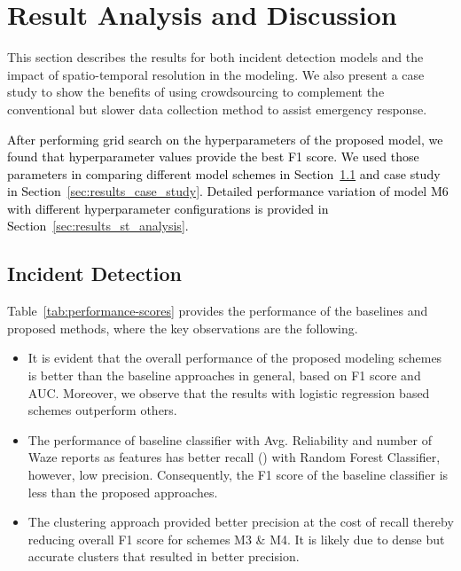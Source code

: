 \documentclass[conference]{IEEEtran}
\begin{document}
\section{Result Analysis and Discussion}
\label{sec:results}



This section describes the results for both incident detection models and the impact of spatio-temporal resolution in the modeling. We also present a case study to show the benefits of using crowdsourcing to complement the conventional but slower data collection method to assist emergency response. 

\textcolor{black}{After performing grid search on the hyperparameters of the proposed model, we found that hyperparameter values  provide the best F1 score. We used those parameters in comparing different model schemes in Section~\ref{sec:results_detection} and case study in Section~\ref{sec:results_case_study}. Detailed performance variation of model M6 with different hyperparameter configurations is provided in Section~\ref{sec:results_st_analysis}.}



\subsection{Incident Detection}
\label{sec:results_detection}




Table~\ref{tab:performance-scores} provides the performance of the baselines and proposed methods, where the key observations are the following. 
\begin{itemize}[leftmargin=*]
    \item  It is evident that the overall performance of the proposed modeling schemes is better than the baseline approaches in general, based on F1 score and AUC. Moreover, we observe that the results with logistic regression based schemes outperform others. 

    \item The performance of baseline classifier with Avg. Reliability and number of Waze reports as features has better recall () with Random Forest Classifier, however, low precision. Consequently, the F1 score of the baseline classifier is less than the proposed approaches. 

    \item The clustering approach provided better precision at the cost of recall thereby reducing overall F1 score for schemes M3 \& M4. It is likely due to dense but accurate clusters that resulted in better precision. 
\end{itemize}
\end{document}
